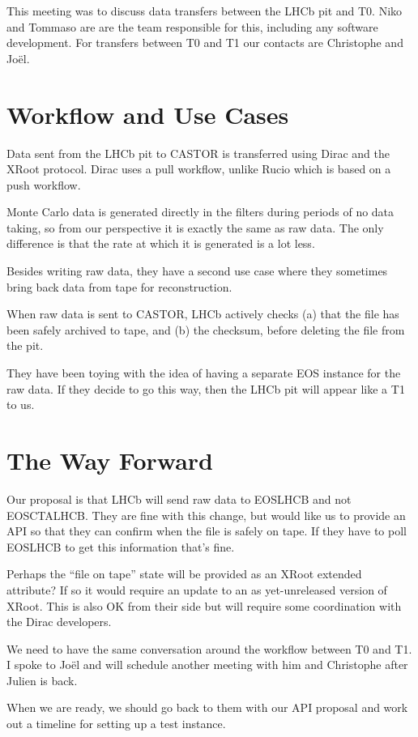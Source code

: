 \documentclass{lhcb+cta}
\begin{document}
This meeting was to discuss data transfers between the LHCb pit and T0. Niko and Tommaso are are the team responsible for this, including any software development. For transfers between T0 and T1 our contacts are Christophe and Jo\"{e}l.


\section*{Workflow and Use Cases}

Data sent from the LHCb pit to CASTOR is transferred using Dirac and the XRoot protocol. Dirac uses a pull workflow, unlike Rucio which is based on a push workflow.

Monte Carlo data is generated directly in the filters during periods of no data taking, so from our perspective it is exactly the same as raw data. The only difference is that the rate at which it is generated is a lot less.

Besides writing raw data, they have a second use case where they sometimes bring back data from tape for reconstruction.

When raw data is sent to CASTOR, LHCb actively checks (a) that the file has been safely archived to tape, and (b) the checksum, before deleting the file from the pit.

They have been toying with the idea of having a separate EOS instance for the raw data. If they decide to go this way, then the LHCb pit will appear like a T1 to us.

\section*{The Way Forward}

Our proposal is that LHCb will send raw data to EOSLHCB and not EOSCTALHCB. They are fine with this change, but would like us to provide an API so that they can confirm when the file is safely on tape. If they have to poll EOSLHCB to get this information that's fine.

Perhaps the ``file on tape'' state will be provided as an XRoot extended attribute? If so it would require an update to an as yet-unreleased version of XRoot. This is also OK from their side but will require some coordination with the Dirac developers.

We need to have the same conversation around the workflow between T0 and T1. I spoke to Jo\"{e}l and will schedule another meeting with him and Christophe after Julien is back.

When we are ready, we should go back to them with our API proposal and work out a timeline for setting up a test instance.
\end{document}
